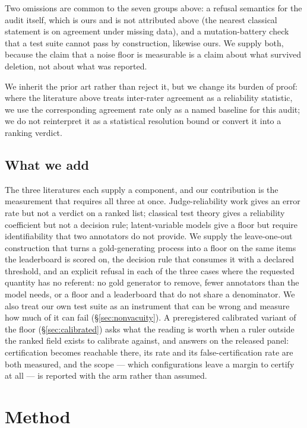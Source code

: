 \documentclass{article}
\begin{document}
Two omissions are common to the seven groups above: a refusal semantics for the audit itself, which is ours and is not attributed above (the nearest classical statement is \cite{krippendorff2004} on agreement under missing data), and a mutation-battery check that a test suite cannot pass by construction, likewise ours. We supply both, because the claim that a noise floor is measurable is a claim about what survived deletion, not about what was reported.

We inherit the prior art rather than reject it, but we change its burden of proof: where the literature above treats inter-rater agreement as a reliability statistic, we use the corresponding agreement rate only as a named baseline for this audit; we do not reinterpret it as a statistical resolution bound or convert it into a ranking verdict.


\subsection{What we add}

The three literatures each supply a component, and our contribution is the
measurement that requires all three at once. Judge-reliability work gives an
error rate but not a verdict on a ranked list; classical test theory gives a
reliability coefficient but not a decision rule; latent-variable models give a
floor but require identifiability that two annotators do not provide. We
supply the leave-one-out construction that turns a gold-generating process
into a floor on the same items the leaderboard is scored on, the decision rule
that consumes it with a declared threshold, and an explicit refusal in each of
the three cases where the requested quantity has no referent: no gold
generator to remove, fewer annotators than the model needs, or a floor and a
leaderboard that do not share a denominator. We also treat our own test suite
as an instrument that can be wrong and measure how much of it can fail
(\S\ref{sec:nonvacuity}). A preregistered calibrated variant of the floor
(\S\ref{sec:calibrated}) asks what the reading is worth when a ruler outside the
ranked field exists to calibrate against, and answers on the released panel:
certification becomes reachable there, its rate and its false-certification rate
are both measured, and the scope --- which configurations leave a margin to
certify at all --- is reported with the arm rather than assumed.

\section{Method}
\label{sec:method}
\end{document}
